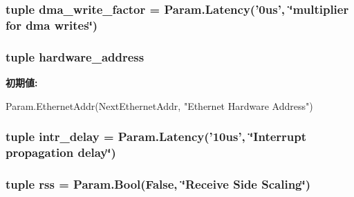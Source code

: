 \label{classEthernet_1_1EtherDevBase_a9d3ab02a832357b6fb582d9cefbb1ccd}
\hypertarget{classEthernet_1_1EtherDevBase_ab089378f86c775ef8dd0105bc8f9b41a}{
\subsubsection[{dma\_\-write\_\-factor}]{\setlength{\rightskip}{0pt plus 5cm}tuple {\bf dma\_\-write\_\-factor} = Param.Latency('0us', \char`\"{}multiplier for dma writes\char`\"{})}}
\label{classEthernet_1_1EtherDevBase_ab089378f86c775ef8dd0105bc8f9b41a}
\hypertarget{classEthernet_1_1EtherDevBase_a0a01a2a0083560db04121eeee8c8e9fe}{
\subsubsection[{hardware\_\-address}]{\setlength{\rightskip}{0pt plus 5cm}tuple {\bf hardware\_\-address}}}
\label{classEthernet_1_1EtherDevBase_a0a01a2a0083560db04121eeee8c8e9fe}
{\bfseries 初期値:}
\begin{DoxyCode}
Param.EthernetAddr(NextEthernetAddr,
        "Ethernet Hardware Address")
\end{DoxyCode}
\hypertarget{classEthernet_1_1EtherDevBase_ada0270f07afebf847f93584de622ea06}{
\subsubsection[{intr\_\-delay}]{\setlength{\rightskip}{0pt plus 5cm}tuple {\bf intr\_\-delay} = Param.Latency('10us', \char`\"{}Interrupt propagation delay\char`\"{})}}
\label{classEthernet_1_1EtherDevBase_ada0270f07afebf847f93584de622ea06}
\hypertarget{classEthernet_1_1EtherDevBase_af2015635a2dcdded8ab49040988fe57e}{
\subsubsection[{rss}]{\setlength{\rightskip}{0pt plus 5cm}tuple {\bf rss} = Param.Bool(False, \char`\"{}Receive Side Scaling\char`\"{})}}
